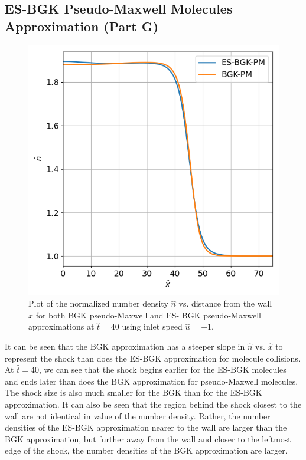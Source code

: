 \documentclass[a4paper]{article}
\begin{document}
\subsection{ES-BGK Pseudo-Maxwell Molecules Approximation (Part G)}
\begin{figure}[hbt!]
    \centering
    \includegraphics[width=14cm]{plots/problem_g_n.png}
    \caption{\centering Plot of the normalized number density $\hat{n}$ vs. distance from the wall $\hat{x}$ for both BGK pseudo-Maxwell and ES- BGK pseudo-Maxwell approximations at $\hat{t} = 40$ using inlet speed $\hat{u} = -1$.}
    \label{problem_g_n}
\end{figure}
It can be seen that the BGK approximation has a steeper slope in $\hat{n}$ vs. $\hat{x}$ to represent the shock than does the ES-BGK approximation for molecule collisions. At $\hat{t} = 40$, we can see that the shock begins earlier for the ES-BGK molecules and ends later than does the BGK approximation for pseudo-Maxwell molecules. The shock size is also much smaller for the BGK than for the ES-BGK approximation. It can also be seen that the region behind the shock closest to the wall are not identical in value of the number density. Rather, the number densities of the ES-BGK approximation nearer to the wall are larger than the BGK approximation, but further away from the wall and closer to the leftmost edge of the shock, the number densities of the BGK approximation are larger. 
\end{document}
